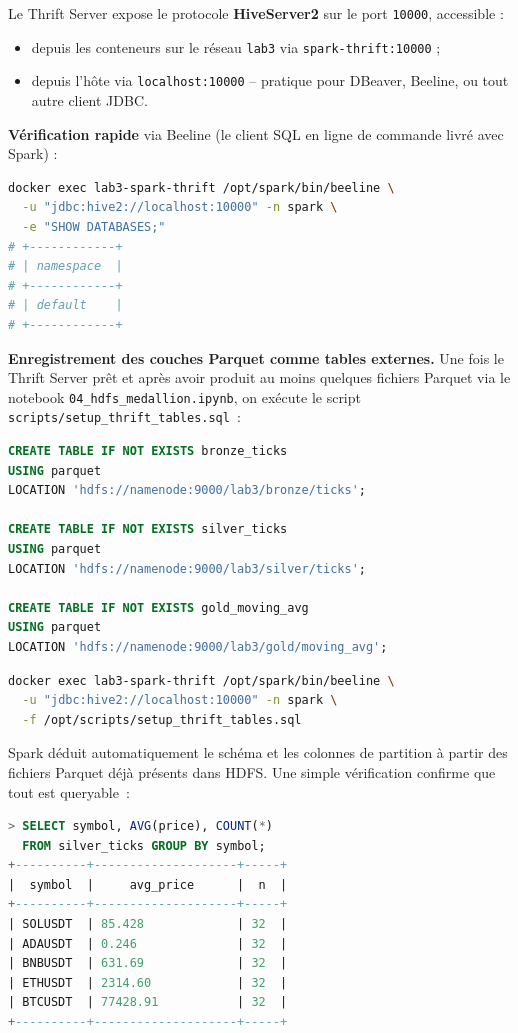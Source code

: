 \documentclass{RapportINPTCLOUD}
\begin{document}
Le Thrift Server expose le protocole \textbf{HiveServer2} sur le port \texttt{10000}, accessible :
\begin{itemize}[leftmargin=2em]
    \item depuis les conteneurs sur le r\'{e}seau \texttt{lab3} via \texttt{spark-thrift:10000} ;
    \item depuis l'h\^{o}te via \texttt{localhost:10000} -- pratique pour DBeaver, Beeline, ou tout autre client JDBC.
\end{itemize}

\textbf{V\'{e}rification rapide} via Beeline (le client SQL en ligne de commande livr\'{e} avec Spark) :
\begin{lstlisting}[style=code, language=bash]
docker exec lab3-spark-thrift /opt/spark/bin/beeline \
  -u "jdbc:hive2://localhost:10000" -n spark \
  -e "SHOW DATABASES;"
# +------------+
# | namespace  |
# +------------+
# | default    |
# +------------+
\end{lstlisting}

\textbf{Enregistrement des couches Parquet comme tables externes.} Une fois le Thrift Server pr\^{e}t et apr\`{e}s avoir produit au moins quelques fichiers Parquet via le notebook \texttt{04\_hdfs\_medallion.ipynb}, on ex\'{e}cute le script \texttt{scripts/setup\_thrift\_tables.sql}~:

\begin{lstlisting}[style=code, language=SQL, caption=setup\_thrift\_tables.sql]
CREATE TABLE IF NOT EXISTS bronze_ticks
USING parquet
LOCATION 'hdfs://namenode:9000/lab3/bronze/ticks';

CREATE TABLE IF NOT EXISTS silver_ticks
USING parquet
LOCATION 'hdfs://namenode:9000/lab3/silver/ticks';

CREATE TABLE IF NOT EXISTS gold_moving_avg
USING parquet
LOCATION 'hdfs://namenode:9000/lab3/gold/moving_avg';
\end{lstlisting}

\begin{lstlisting}[style=code, language=bash]
docker exec lab3-spark-thrift /opt/spark/bin/beeline \
  -u "jdbc:hive2://localhost:10000" -n spark \
  -f /opt/scripts/setup_thrift_tables.sql
\end{lstlisting}

Spark d\'{e}duit automatiquement le sch\'{e}ma et les colonnes de partition \`{a} partir des fichiers Parquet d\'{e}j\`{a} pr\'{e}sents dans HDFS. Une simple v\'{e}rification confirme que tout est queryable~:

\begin{lstlisting}[style=code, language=SQL]
> SELECT symbol, AVG(price), COUNT(*)
  FROM silver_ticks GROUP BY symbol;
+----------+--------------------+-----+
|  symbol  |     avg_price      |  n  |
+----------+--------------------+-----+
| SOLUSDT  | 85.428             | 32  |
| ADAUSDT  | 0.246              | 32  |
| BNBUSDT  | 631.69             | 32  |
| ETHUSDT  | 2314.60            | 32  |
| BTCUSDT  | 77428.91           | 32  |
+----------+--------------------+-----+
\end{lstlisting}
\end{document}
